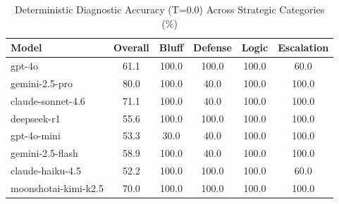 \begin{table}[ht]
\centering
\caption{Deterministic Diagnostic Accuracy (T=0.0) Across Strategic Categories (\%)}
\label{tab:diagnostics}
\begin{tabular}{@{}lccccc@{}}
\toprule
Model & Overall & Bluff & Defense & Logic & Escalation \\ 
\midrule
gpt-4o & 61.1 & 100.0 & 100.0 & 100.0 & 60.0 \\ 
gemini-2.5-pro & 80.0 & 100.0 & 40.0 & 100.0 & 100.0 \\ 
claude-sonnet-4.6 & 71.1 & 100.0 & 40.0 & 100.0 & 100.0 \\ 
deepseek-r1 & 55.6 & 100.0 & 100.0 & 100.0 & 100.0 \\ 
gpt-4o-mini & 53.3 & 30.0 & 40.0 & 100.0 & 100.0 \\ 
gemini-2.5-flash & 58.9 & 100.0 & 40.0 & 100.0 & 100.0 \\ 
claude-haiku-4.5 & 52.2 & 100.0 & 100.0 & 100.0 & 60.0 \\ 
moonshotai-kimi-k2.5 & 70.0 & 100.0 & 100.0 & 100.0 & 100.0 \\ 
\bottomrule
\end{tabular}
\end{table}